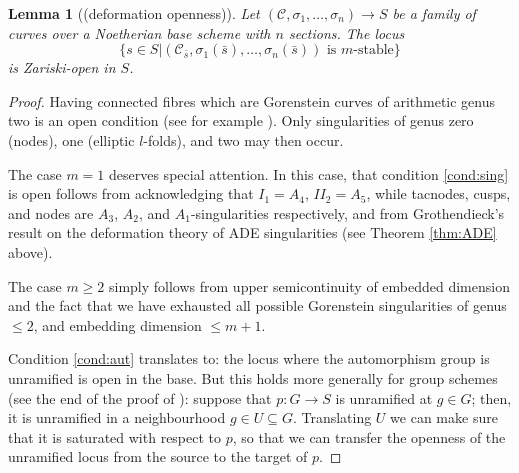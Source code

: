 \documentclass{compositio}
\renewcommand{\to}{\rightarrow}
\theoremstyle{plain}
\newtheorem{lem}[thm]{Lemma}
\theoremstyle{definition}
\theoremstyle{remark}
\begin{document}
\begin{lem}[(deformation openness)]\label{lem:defop}
 Let $(\mathcal C,\sigma_1,\ldots,\sigma_n)\to S$ be a family of curves over a Noetherian base scheme with $n$ sections. The locus \[\{s\in S|(\mathcal C_{\bar s},\sigma_1(\bar s),\ldots,\sigma_n(\bar s)) \text{ is } m\text{-stable}\}\] is Zariski-open in $S$.
\end{lem}
\begin{proof}
 Having connected fibres which are Gorenstein curves of arithmetic genus two is an open condition (see for example \cite[\href{https://stacks.math.columbia.edu/tag/0E1M}{Tag 0E1M}]{stacks-project}). Only singularities of genus zero (nodes), one (elliptic $l$-folds), and two may then occur.
 
 The case $m=1$ deserves special attention. In this case, that condition \eqref{cond:sing} is open follows from acknowledging that $I_1=A_4$, $I\!I_2=A_5$, while tacnodes, cusps, and nodes are $A_3$, $A_2$, and $A_1$-singularities respectively, and from Grothendieck's result on the deformation theory of ADE singularities (see Theorem \ref{thm:ADE} above).
 
 The case $m\geq 2$ simply follows from upper semicontinuity of embedded dimension and the fact that we have exhausted all possible Gorenstein singularities of genus $\leq 2$, and embedding dimension $\leq m+1$.
 
 Condition \eqref{cond:aut} translates to: the locus where the automorphism group is unramified is open in the base. But this holds more generally for group schemes (see the end of the proof of \cite[Lemma 3.10]{SMY1}): suppose that $p\colon G\to S$ is unramified at $g\in G$; then, it is unramified in a neighbourhood $g\in U\subseteq G$. Translating $U$ we can make sure that it is saturated with respect to $p$, so that we can transfer the openness of the unramified locus from the source to the target of $p$.
 

\end{proof}
\end{document}
